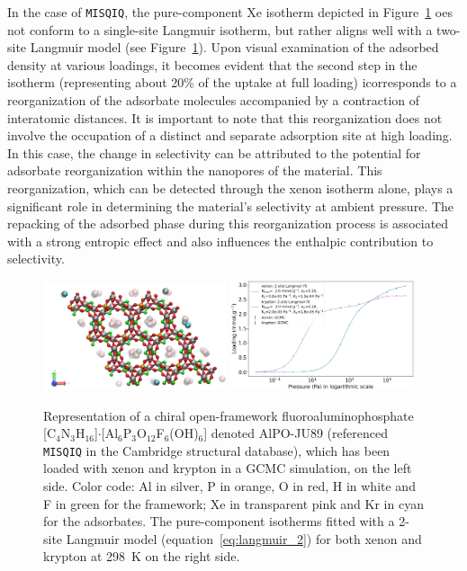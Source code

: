 \documentclass[main.tex]{subfiles}
\begin{document}
In the case of \texttt{MISQIQ}, the pure-component Xe isotherm depicted in Figure~\ref{fgr:MISQIQ} oes not conform to a single-site Langmuir isotherm, but rather aligns well with a two-site Langmuir model (see Figure~\ref{fgr:MISQIQ}). Upon visual examination of the adsorbed density at various loadings, it becomes evident that the second step in the isotherm (representing about {20\%} of the uptake at full loading) icorresponds to a reorganization of the adsorbate molecules accompanied by a contraction of interatomic distances. It is important to note that this reorganization does not involve the occupation of a distinct and separate adsorption site at high loading. In this case, the change in selectivity can be attributed to the potential for adsorbate reorganization within the nanopores of the material. This reorganization, which can be detected through the xenon isotherm alone, plays a significant role in determining the material's selectivity at ambient pressure. The repacking of the adsorbed phase during this reorganization process is associated with a strong entropic effect and also influences the enthalpic contribution to selectivity.

\begin{figure}[t]
  \centering
    \includegraphics[width=0.48\textwidth]{figures/2-thermo/MISQIQ_clean.jpg}\hfill
    \includegraphics[width=0.48\textwidth]{figures/2-thermo/MISQIQ_clean_isotherm_xenon_krypton_298K.jpg}
    \caption{Representation of a chiral open-framework fluoroaluminophosphate [C$_4$N$_3$H$_{16}$]$\cdot$[Al$_6$P$_3$O$_{12}$F$_6$(OH)$_6$] denoted AlPO-JU89 (referenced \texttt{MISQIQ} in the Cambridge structural database), which has been loaded with xenon and krypton in a GCMC simulation, on the left side.\autocite{MISQIQ} Color code: Al in silver, P in orange, O in red, H in white and F in green for the framework; Xe in transparent pink and Kr in cyan for the adsorbates. The pure-component isotherms fitted with a 2-site Langmuir model (equation~\ref{eq:langmuir_2}) for both xenon and krypton at \SI{298}{\kelvin} on the right side.}\label{fgr:MISQIQ}
  \end{figure}
\end{document}
